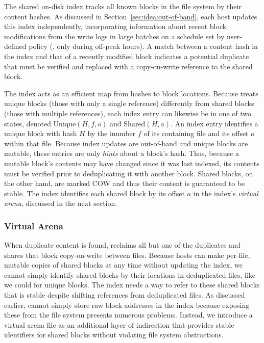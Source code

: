 The shared on-disk index tracks all known blocks in the file system by
their content hashes.  As discussed in
Section~\ref{sec:idea:out-of-band}, each host updates this index
independently, incorporating information about recent block
modifications from the write logs in large batches on a schedule set
by user-defined policy (\eg, only during off-peak hours). A match
between a content hash in the index and that of a recently modified
block indicates a potential duplicate that must be verified and
replaced with a copy-on-write reference to the shared block.


The index acts as an efficient map from hashes to block locations.
Because \DeDe treats unique blocks (those with only a single
reference) differently from shared blocks (those with multiple
references), each index entry can likewise be in one of two states,
denoted $\text{Unique}(H,f,o)$ and $\text{Shared}(H,a)$.  An index
entry identifies a unique block with hash $H$ by the inumber $f$ of
its containing file and its offset $o$ within that file.  Because
index updates are out-of-band and unique blocks are mutable, these
entries are only \emph{hints} about a block's hash.  Thus, because a mutable
block's contents may have changed since it was last indexed, its
contents must be verified prior to deduplicating it with another
block.  Shared blocks, on the other hand, are marked COW and thus
their content is guaranteed to be stable.  The index identifies each
shared block by its offset $a$ in the index's \emph{virtual arena},
discussed in the next section.

\subsubsection{Virtual Arena}

When duplicate content is found, \DeDe reclaims all but one of the duplicates
and shares that block copy-on-write between files.  Because hosts can
make per-file, mutable copies of shared blocks at any time without
updating the index, we cannot simply identify shared blocks by their
locations in deduplicated files, like we could for unique blocks.  The
index needs a way to refer to these shared blocks that is stable
despite shifting references from deduplicated files.  As
discussed earlier, \DeDe cannot simply store raw block addresses in the
index because exposing these from the file system presents numerous
problems.  Instead, we introduce a virtual arena file as an
additional layer of indirection that provides stable identifiers for
shared blocks without violating file system abstractions.

